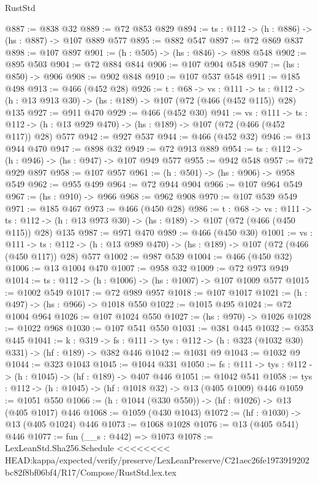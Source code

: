 \begin{lexlean}{RustStd}
\begin{coremodule}
{\begin{coremodule}
{{{{@887 := @838 @32
@889 := @72 @853 @829
@894 := {ts : @112} -> (h : @886) -> (hs : @887) -> @107 @889 @577
@895 := @882 @547
@897 := @72 @869 @837
@898 := @107 @897
@901 := (h : @505) -> (hs : @846) -> @898 @548
@902 := @895 @503
@904 := @72 @884 @844
@906 := @107 @904 @548
@907 := (hs : @850) -> @906
@908 := @902 @848
@910 := @107 @537 @548
@911 := @185 @498
@913 := @466 (@452 @28)
@926 := {t : @68} ->
  {vs : @111} ->
  {ts : @112} -> (h : @13 @913 @30) -> (hs : @189) -> @107 (@72 (@466 (@452 @115)) @28) @135
@927 := @911 @470
@929 := @466 (@452 @30)
@941 := {vs : @111} ->
  {ts : @112} -> (h : @13 @929 @470) -> (hs : @189) -> @107 (@72 (@466 (@452 @117)) @28) @577
@942 := @927 @537
@944 := @466 (@452 @32)
@946 := @13 @944 @470
@947 := @898 @32
@949 := @72 @913 @889
@954 := {ts : @112} -> (h : @946) -> (hs : @947) -> @107 @949 @577
@955 := @942 @548
@957 := @72 @929 @897
@958 := @107 @957
@961 := (h : @501) -> (hs : @906) -> @958 @549
@962 := @955 @499
@964 := @72 @944 @904
@966 := @107 @964 @549
@967 := (hs : @910) -> @966
@968 := @962 @908
@970 := @107 @539 @549
@971 := @185 @467
@973 := @466 (@450 @28)
@986 := {t : @68} ->
  {vs : @111} ->
  {ts : @112} -> (h : @13 @973 @30) -> (hs : @189) -> @107 (@72 (@466 (@450 @115)) @28) @135
@987 := @971 @470
@989 := @466 (@450 @30)
@1001 := {vs : @111} ->
  {ts : @112} -> (h : @13 @989 @470) -> (hs : @189) -> @107 (@72 (@466 (@450 @117)) @28) @577
@1002 := @987 @539
@1004 := @466 (@450 @32)
@1006 := @13 @1004 @470
@1007 := @958 @32
@1009 := @72 @973 @949
@1014 := {ts : @112} -> (h : @1006) -> (hs : @1007) -> @107 @1009 @577
@1015 := @1002 @549
@1017 := @72 @989 @957
@1018 := @107 @1017
@1021 := (h : @497) -> (hs : @966) -> @1018 @550
@1022 := @1015 @495
@1024 := @72 @1004 @964
@1026 := @107 @1024 @550
@1027 := (hs : @970) -> @1026
@1028 := @1022 @968
@1030 := @107 @541 @550
@1031 := @381 @445
@1032 := @353 @445
@1041 := {k : @319} ->
  {fs : @111} -> {tys : @112} -> (h : @323 (@1032 @30) @331) -> (hf : @189) -> @382 @446
@1042 := @1031 @9
@1043 := @1032 @9
@1044 := @323 @1043
@1045 := @1044 @331
@1050 := {fs : @111} -> {tys : @112} -> (h : @1045) -> (hf : @189) -> @407 @446
@1051 := @1042 @541
@1058 := {tys : @112} -> (h : @1045) -> (hf : @1018 @32) -> @13 (@405 @1009) @446
@1059 := @1051 @550
@1066 := (h : @1044 (@330 @550)) -> (hf : @1026) -> @13 (@405 @1017) @446
@1068 := @1059 (@430 @1043)
@1072 := (hf : @1030) -> @13 (@405 @1024) @446
@1073 := @1068 @1028
@1076 := @13 (@405 @541) @446
@1077 := fun (__s : @442) => @1073
@1078 := LexLeanStd.Sha256.Schedule
<<<<<<<< HEAD:kappa/expected/verify/preserve/LexLeanPreserve/C21aec26fe1973919202bc82f8bf06bf4/R17/Compose/RustStd.lex.tex
}}}}
\end{coremodule}}
\end{coremodule}
\end{lexlean}

